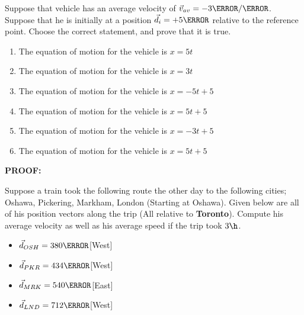 \documentclass[12pt]{article} %
\begin{document}
\begin{qstn}[5]
Suppose that vehicle has an average velocity of $\vec v_{av} = -3 \m / \s$. Suppose that he is initially at a position $\vec d_i = +5 \m$ relative to the reference point. Choose the correct statement, and prove that it is true.
	\begin{enumerate}[label = (\alph*)]
		\item The equation of motion for the vehicle is $x = 5t$
		\item The equation of motion for the vehicle is $x = 3t$
		\item The equation of motion for the vehicle is $x = -5t + 5$
		\item The equation of motion for the vehicle is $x = 5t + 5$
		\item The equation of motion for the vehicle is $x = -3t + 5$
		\item The equation of motion for the vehicle is $x = 5t + 5$
	\end{enumerate}

	

\textbf{PROOF: }

\end{qstn}





\begin{qstn}[6]
	Suppose a train took the following route the other day to the following cities; Oshawa, Pickering, Markham, London (Starting at Oshawa). Given below are all of his position vectors along the trip (All relative to \textbf{Toronto}). Compute his average velocity as well as his average speed if the trip took $3 \h$.
	\begin{itemize}
	\item $\vec d_{OSH} = 380\km$[West]
	\item $\vec d_{PKR} = 434\km$[West]
	\item $\vec d_{MRK} = 540\km$[East]
	\item $\vec d_{LND} = 712\km$[West]
	\end{itemize}
	

\end{qstn}
\end{document}
